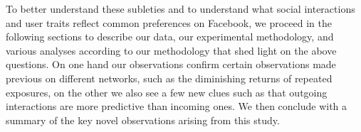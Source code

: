 To better understand these subleties and to understand what
social interactions and user traits reflect common preferences on
Facebook, we proceed in the following sections to describe our data,
our experimental methodology, and various analyses according to our
methodology that shed light on the above questions. 
On one hand our observations confirm certain observations made previous 
on different networks, such as the diminishing returns of repeated exposures, 
on the other we also see a few new clues such as 
that outgoing interactions are more predictive 
than incoming ones. 
We then conclude with a summary of the key novel observations arising
from this study.


